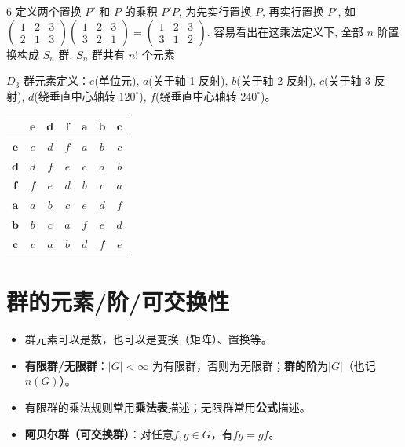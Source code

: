 \documentclass[landscape]{article}
\begin{document}
\begin{multicols*}{6}
\noindent 定义两个置换 $P'$ 和 $P$ 的乘积 $P'P$, 为先实行置换 $P$, 再实行置换 $P'$, 如
\\
$
\begin{pmatrix} 
1 & 2 & 3 \\ 
2 & 1 & 3 
\end{pmatrix}
\begin{pmatrix} 
1 & 2 & 3 \\ 
3 & 2 & 1 
\end{pmatrix}
=
\begin{pmatrix} 
1 & 2 & 3 \\ 
3 & 1 & 2 
\end{pmatrix}.
$
容易看出在这乘法定义下, 全部 $n$ 阶置换构成 $S_n$ 群. $S_n$ 群共有 $n!$ 个元素

$D_3$ 群元素定义：$e$(单位元), $a$(关于轴 1 反射), 
$b$(关于轴 2 反射), $c$(关于轴 3 反射), $d$(绕垂直中心轴转 $120^\circ$), $f$(绕垂直中心轴转 $240^\circ$)。
\begin{tabular}{|c|c c c c c c|}
    \hline
      & $\boldsymbol{e}$ & $\boldsymbol{d}$ & $\boldsymbol{f}$ & $\boldsymbol{a}$ & $\boldsymbol{b}$ & $\boldsymbol{c}$ \\
    \hline
    $\boldsymbol{e}$ & $e$ & $d$ & $f$ & $a$ & $b$ & $c$ \\
    $\boldsymbol{d}$ & $d$ & $f$ & $e$ & $c$ & $a$ & $b$ \\
    $\boldsymbol{f}$ & $f$ & $e$ & $d$ & $b$ & $c$ & $a$ \\
    $\boldsymbol{a}$ & $a$ & $b$ & $c$ & $e$ & $d$ & $f$ \\
    $\boldsymbol{b}$ & $b$ & $c$ & $a$ & $f$ & $e$ & $d$ \\
    $\boldsymbol{c}$ & $c$ & $a$ & $b$ & $d$ & $f$ & $e$ \\
    \hline
\end{tabular}
\par

\section*{群的元素/阶/可交换性}
\begin{itemize}
  \item 群元素可以是数，也可以是变换（矩阵）、置换等。
  \item \textbf{有限群/无限群}：$|G|<\infty$ 为有限群，否则为无限群；\textbf{群的阶}为$|G|$（也记$n(G)$）。
  \item 有限群的乘法规则常用\textbf{乘法表}描述；无限群常用\textbf{公式}描述。
  \item \textbf{阿贝尔群（可交换群）}：对任意$f,g\in G$，有$fg=gf$。
\end{itemize}


\end{multicols*}
\end{document}
